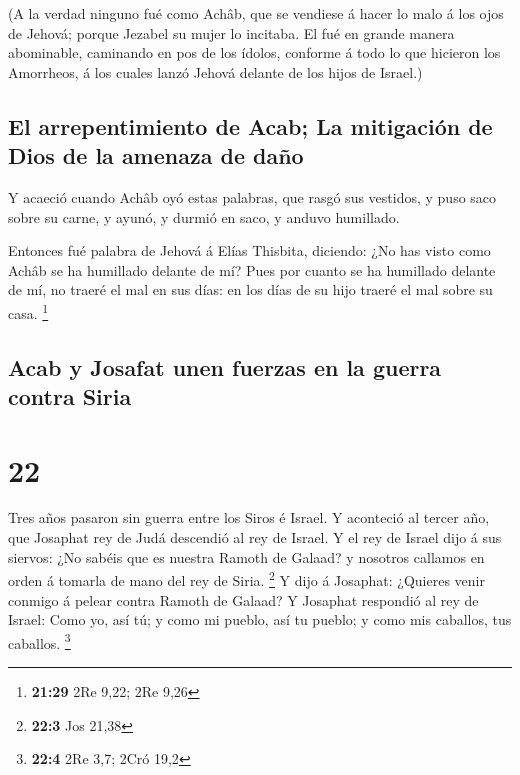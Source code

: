  (A la verdad ninguno fué como Achâb, que se vendiese á
hacer lo malo á los ojos de Jehová; porque Jezabel su mujer lo incitaba.
 El fué en grande manera abominable, caminando en pos de
los ídolos, conforme á todo lo que hicieron los Amorrheos, á los cuales
lanzó Jehová delante de los hijos de Israel.)

\hypertarget{el-arrepentimiento-de-acab-la-mitigaciuxf3n-de-dios-de-la-amenaza-de-dauxf1o}{%
\subsection{El arrepentimiento de Acab; La mitigación de Dios de la
amenaza de
daño}\label{el-arrepentimiento-de-acab-la-mitigaciuxf3n-de-dios-de-la-amenaza-de-dauxf1o}}

 Y acaeció cuando Achâb oyó estas palabras, que rasgó sus
vestidos, y puso saco sobre su carne, y ayunó, y durmió en saco, y
anduvo humillado.

 Entonces fué palabra de Jehová á Elías Thisbita,
diciendo:  ¿No has visto como Achâb se ha humillado
delante de mí? Pues por cuanto se ha humillado delante de mí, no traeré
el mal en sus días: en los días de su hijo traeré el mal sobre su casa.
\footnote{\textbf{21:29} 2Re 9,22; 2Re 9,26}

\hypertarget{acab-y-josafat-unen-fuerzas-en-la-guerra-contra-siria}{%
\subsection{Acab y Josafat unen fuerzas en la guerra contra
Siria}\label{acab-y-josafat-unen-fuerzas-en-la-guerra-contra-siria}}

\hypertarget{section-21}{%
\section{22}\label{section-21}}

 Tres años pasaron sin guerra entre los Siros é Israel.
 Y aconteció al tercer año, que Josaphat rey de Judá
descendió al rey de Israel.  Y el rey de Israel dijo á sus
siervos: ¿No sabéis que es nuestra Ramoth de Galaad? y nosotros callamos
en orden á tomarla de mano del rey de Siria. \footnote{\textbf{22:3} Jos
  21,38}  Y dijo á Josaphat: ¿Quieres venir conmigo á
pelear contra Ramoth de Galaad? Y Josaphat respondió al rey de Israel:
Como yo, así tú; y como mi pueblo, así tu pueblo; y como mis caballos,
tus caballos. \footnote{\textbf{22:4} 2Re 3,7; 2Cró 19,2}

